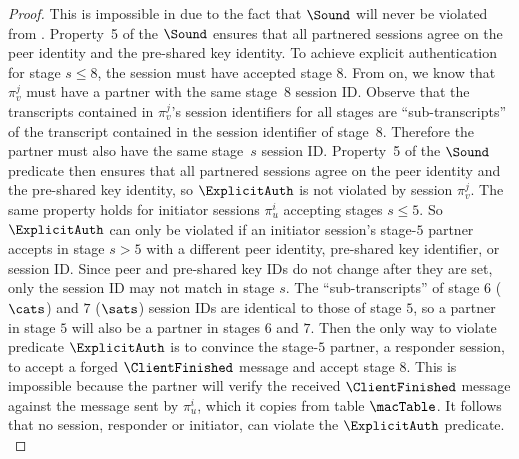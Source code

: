 \begin{proof}
{	This is impossible in \thisGame due to the fact that $ \Sound $ will never be violated from .
	Property~5 of the $ \Sound $ ensures that all partnered sessions agree on the peer identity and the pre-shared key identity.
}{
To achieve explicit authentication for stage $s \leq 8$, the session must have accepted stage $8$.
From \thisGame on, we know that $\pi_v^j$ must have a partner with the same stage~$8$ session ID.
Observe that the transcripts contained in $\pi_v^j$'s session identifiers for all stages are ``sub-transcripts'' of the transcript contained in the session identifier of stage~$8$.
Therefore the partner must also have the same stage~$s$ session ID.
Property~5 of the $ \Sound $ predicate then ensures that all partnered sessions agree on the peer identity and the pre-shared key identity, so $\ExplicitAuth$ is not violated by session $\pi_v^j$.
The same property holds for initiator sessions $\pi_u^i$ accepting stages $s \leq 5$.
So $\ExplicitAuth$ can only be violated if an initiator session's stage-$5$ partner accepts in stage $s > 5$ with a different peer identity, pre-shared key identifier, or session ID. 
Since peer and pre-shared key IDs do not change after they are set, only the session ID may not match in stage $s$.
The ``sub-transcripts'' of stage $6$ ($\cats$) and $7$ ($\sats$) session IDs are identical to those of stage $5$, so a partner in stage $5$ will also be a partner in stages $6$ and $7$.
Then the only way to violate predicate $\ExplicitAuth$ is to convince the stage-$5$ partner, a responder session, to accept a forged $\ClientFinished$ message and accept stage $8$.
This is impossible because the partner will verify the received $\ClientFinished$ message against the message sent by $\pi_u^i$, which it copies from table $\macTable$.
It follows that no session, responder or initiator, can violate the $\ExplicitAuth$ predicate.
}


\end{proof}
